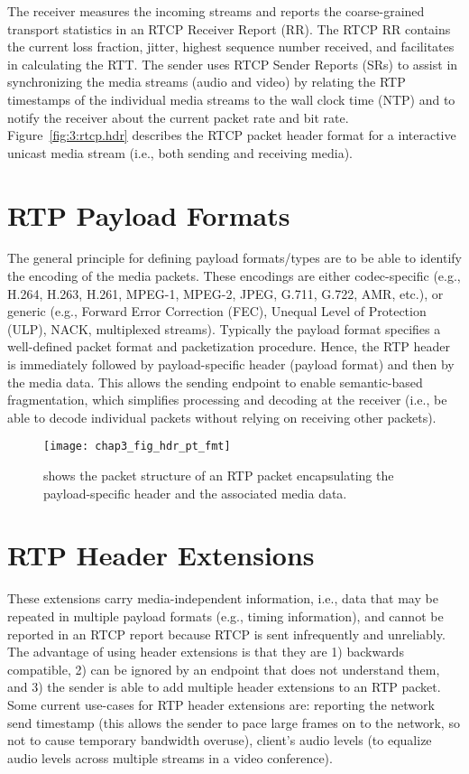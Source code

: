 The receiver measures the incoming streams and reports the coarse-grained
transport statistics in an RTCP Receiver Report (RR). The RTCP RR contains the
current loss fraction, jitter, highest sequence number received, and
facilitates in calculating the RTT. The sender uses RTCP Sender Reports (SRs)
to assist in synchronizing the media streams (audio and video) by relating the
RTP timestamps of the individual media streams to the wall clock time (NTP)
and to notify the receiver about the current packet rate and bit rate.
Figure~\ref{fig:3:rtcp.hdr} describes the RTCP packet header format for a
interactive unicast media stream (i.e., both sending and receiving media).

\section{RTP Payload Formats}

The general principle for defining payload formats/types are to be able to
identify the encoding of the media packets. These encodings are either
codec-specific (e.g., H.264, H.263, H.261, MPEG-1, MPEG-2, JPEG, G.711, G.722,
AMR, etc.), or generic (e.g., Forward Error Correction (FEC), Unequal Level of
Protection (ULP), NACK, multiplexed streams). Typically the payload format
specifies a well-defined packet format and packetization procedure. Hence, the
RTP header is immediately followed by payload-specific header (payload format)
and then by the media data. This allows the sending endpoint to enable
semantic-based fragmentation, which simplifies processing and decoding at the
receiver (i.e., be able to decode individual packets without relying on
receiving other packets).

\begin{figure}[!h]
\centerline{\texttt{[image: chap3\_fig\_hdr\_pt\_fmt]}}
\caption{shows the packet structure of an RTP packet encapsulating the
payload-specific header and the associated media data.}
\label{fig:3:pt.fmt}
\end{figure}

\section{RTP Header Extensions}

These extensions carry media-independent information, i.e., data that may be
repeated in multiple payload formats (e.g., timing information), and cannot be
reported in an RTCP report because RTCP is sent infrequently and unreliably.
The advantage of using header extensions is that they are 1) backwards
compatible, 2) can be ignored by an endpoint that does not understand them,
and 3) the sender is able to add multiple header extensions to an RTP packet.
Some current use-cases for RTP header extensions are: reporting the network
send timestamp (this allows the sender to pace large frames on to the network,
so not to cause temporary bandwidth overuse), client's audio levels (to
equalize audio levels across multiple streams in a video conference).

